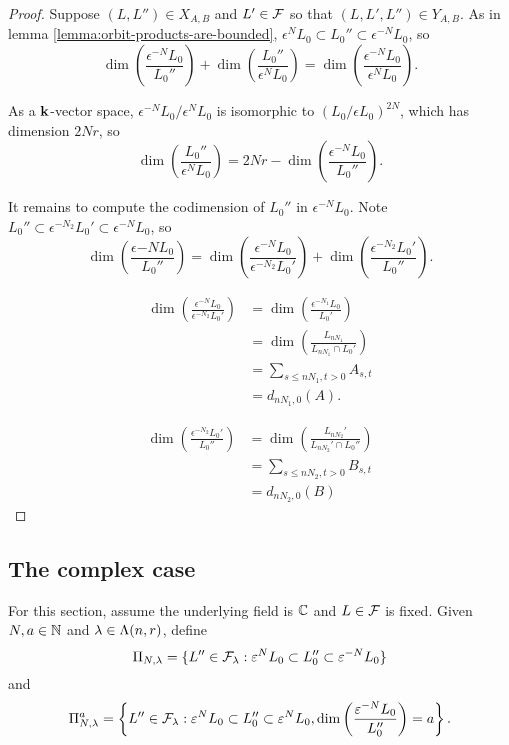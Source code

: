\documentclass[a4paper, 11pt]{report}
\begin{document}
\begin{proof}
Suppose $(L,L'')\in X_{A,B}$ and $L'\in\mathcal{F}$ so that $(L,L',L'')\in Y_{A,B}$. As in lemma \ref{lemma:orbit-products-are-bounded}, $\epsilon^N L_0\subset L_0''\subset \epsilon^{-N}L_0$, so
\begin{equation*}
\dim\left(\frac{\epsilon^{-N}L_0}{L_0''}\right) + \dim\left(\frac{L_0''}{\epsilon^N L_0}\right) = \dim\left(\frac{\epsilon^{-N}L_0}{\epsilon^N L_0}\right).
\end{equation*}

As a $\mathbf{k}$-vector space, $\epsilon^{-N}L_0/\epsilon^N L_0$ is isomorphic to $(L_0/{\epsilon L_0})^{2N}$, which has dimension $2Nr$, so
\begin{equation*}
\dim\left(\frac{L_0''}{\epsilon^N L_0}\right) = 2Nr - \dim\left(\frac{\epsilon^{-N}L_0}{L_0''}\right).
\end{equation*}

It remains to compute the codimension of $L_0''$ in $\epsilon^{-N}L_0$. Note $L_0''\subset \epsilon^{-N_2}L_0'\subset \epsilon^{-N} L_0$, so
\begin{equation*}
\dim\left(\frac{\epsilon{-N}L_0}{L_0''}\right) = \dim\left(\frac{\epsilon^{-N}L_0}{\epsilon^{-N_2}L_0'}\right) + \dim\left(\frac{\epsilon^{-N_2}L_0'}{L_0''}\right).
\end{equation*}

\begin{align*}
\dim\left(\frac{\epsilon^{-N}L_0}{\epsilon^{-N_2}L_0'}\right)
&= \dim\left(\frac{\epsilon^{-N_1}L_0}{L_0'}\right)\\
&= \dim\left(\frac{L_{nN_1}}{L_{nN_1}\cap L_0'}\right)\\
&= \sum_{s\le nN_1, t>0} A_{s,t}\\
&= d_{nN_1,0}(A).
\end{align*}

\begin{align*}
\dim\left(\frac{\epsilon^{-N_2}L_0'}{L_0''}\right)
&= \dim\left(\frac{ L_{nN_2}'}{L_{nN_2}'\cap L_0''}\right)\\
&= \sum_{s\le nN_2, t>0} B_{s,t}\\
&= d_{nN_2,0}(B)
\end{align*}
\end{proof}

\subsection{The complex case}

For this section, assume the underlying field is $\mathbb{C}$ and $L\in\mathcal{F}$ is fixed. Given $N,a\in\mathbb{N}$ and $\lambda\in\Lambda(n,r)$, define
\begin{equation*}
\Pi_{N,\lambda} = \{L''\in\mathcal{F}_\lambda: \varepsilon^N L_0\subset L_0''\subset \varepsilon^{-N}L_0\}
\end{equation*}
and
\begin{equation*}
\Pi_{N,\lambda}^a = \left\{L''\in\mathcal{F}_\lambda: \varepsilon^N L_0\subset L_0''\subset \varepsilon^{N}L_0, \dim\left(\frac{\varepsilon^{-N}L_0}{L_0''}\right) = a\right\}.
\end{equation*}
\end{document}
